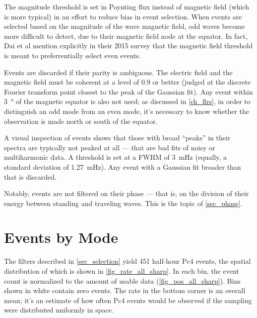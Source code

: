 The magnitude threshold is set in Poynting flux instead of magnetic field
(which is more typical) in an effort to reduce bias in event selection. When
events are selected based on the magnitude of the wave magnetic field, odd
waves become more difficult to detect, due to their magnetic field node at the
equator. In fact, Dai et al mention explicitly in their 2015 survey that the
magnetic field threshold is meant to preferrentially select even
events\cite{dai_2015}. 

Events are discarded if their parity is ambiguous. The electric field and the
magnetic field must be coherent at a level of 0.9 or better (judged at the
discrete Fourier transform point closest to the peak of the Gaussian fit). Any
event within \SI{3}{\degree} of the magnetic equator is also not used; as
discussed in \cref{ch_flrs}, in order to distinguish an odd mode from an even
mode, it's necessary to know whether the observation is made north or south of
the equator. 


A visual inspection of events shows that those with broad ``peaks'' in their
spectra are typically not peaked at all --- that are bad fits of noisy or
multiharmonic data. A
threshold is set at a FWHM of \SI{3}{\mHz} (equally, a standard deviation of
\SI{1.27}{\mHz}). Any event with a Gaussian fit broader than that is discarded.

Notably, events are not filtered on their phase --- that is, on the division of
their energy between standing and traveling waves. This is the topic of
\cref{sec_phase}. 


\section{Events by Mode}
  \label{sec_rate}

The filters described in \cref{sec_selection} yield 451 half-hour Pc4 events,
the spatial
distribution of which is shown in \cref{fig_rate_all_sharp}. In each bin, the
event count is normalized to the amount of usable data
(\cref{fig_pos_all_sharp}). Bins shown in white contain zero events. The rate
in the bottom corner is an overall mean; it's an estimate of how often Pc4
events would be observed if the sampling were distributed uniformly in space.

